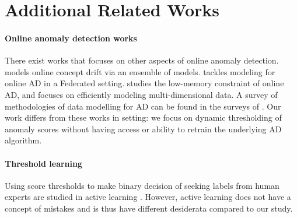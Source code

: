 


\section{Additional Related Works}
\label{app:related}

\paragraph{Online anomaly detection works} There exist works that focuses on other aspects of online anomaly detection. \cite{zhu2023meter} models online concept drift via an ensemble of models.   \cite{nardi2022anomaly} tackles modeling for online AD in a Federated setting. \cite{bhatia2022memstream} studies the low-memory constraint of online AD, and \cite{goyal2020drocc} focuses on efficiently modeling multi-dimensional data. A survey of methodologies of data modelling for AD can be found in the surveys of \cite{chandola2009anomaly, ruff2021unifying, pang2021deep}. Our work differs from these works in setting: we focus on dynamic thresholding of anomaly scores without having access or ability to retrain the underlying AD algorithm.

\paragraph{Threshold learning} Using score thresholds to make binary decision of seeking labels from human experts are studied in active learning \cite{balcan2007margin, zhang2016online,vishwakarma2023promises}. However, active learning does not have a concept of mistakes and is thus have different desiderata compared to our study. 

